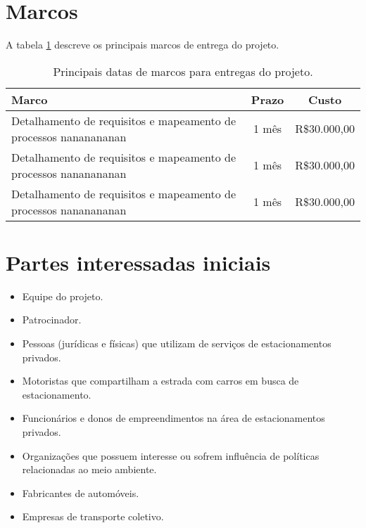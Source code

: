 \section{Marcos}


A tabela \ref{tab:marcos} descreve os principais marcos de entrega do projeto.

\begin{table}[h]
	\begin{tabularx}{.9\textwidth}{| X | c | c |}
		\hline
		\textbf{Marco}                                                   & \textbf{Prazo} & \textbf{Custo} \\
		\hline
		Detalhamento de requisitos e mapeamento de processos nananananan & 1 mês         & R\$30.000,00   \\
		\hline
		Detalhamento de requisitos e mapeamento de processos nananananan & 1 mês         & R\$30.000,00   \\
		\hline
		Detalhamento de requisitos e mapeamento de processos nananananan & 1 mês         & R\$30.000,00   \\
		\hline
	\end{tabularx}
	\centering
	\caption{Principais datas de marcos para entregas do projeto.}
	\label{tab:marcos}
\end{table}

\section{Partes interessadas iniciais}

\begin{itemize}
	\item Equipe do projeto.
	\item Patrocinador.
	\item Pessoas (jurídicas e físicas) que utilizam de serviços de estacionamentos privados.
	\item Motoristas que compartilham a estrada com carros em busca de estacionamento.
	\item Funcionários e donos de empreendimentos na área de estacionamentos privados.
	\item Organizações que possuem interesse ou sofrem influência de políticas relacionadas ao meio ambiente.
	\item Fabricantes de automóveis.
	\item Empresas de transporte coletivo.
\end{itemize}

